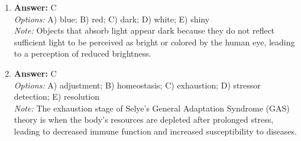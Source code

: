 \documentclass[12pt]{article}
\begin{document}
\begin{enumerate}[label=\arabic*.]
\item \textbf{Answer:} C
\\ \textit{Options:} A) blue; B) red; C) dark; D) white; E) shiny
\\ \textit{Note:} Objects that absorb light appear dark because they do not reflect sufficient light to be perceived as bright or colored by the human eye, leading to a perception of reduced brightness.
\item \textbf{Answer:} C
\\ \textit{Options:} A) adjustment; B) homeostasis; C) exhaustion; D) stressor detection; E) resolution
\\ \textit{Note:} The exhaustion stage of Selye's General Adaptation Syndrome (GAS) theory is when the body's resources are depleted after prolonged stress, leading to decreased immune function and increased susceptibility to diseases.
\end{enumerate}
\end{document}
